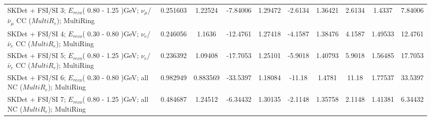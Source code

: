 \documentclass{standalone}
\begin{document}
\begin{tabular}{| l | S | S  S | S  S | S  S | S  S | }
SKDet + FSI/SI  3; $E_{reco}$( 0.80 - 1.25 )GeV; $\nu_{\mu}$/$\bar{\nu}_{\mu}$ CC ($MultiR_{e}$); MultiRing &        0.251603 &         1.22524 &        -7.84006 &         1.29472 &         -2.6134 &         1.36421 &          2.6134 &          1.4337 &         7.84006 \\ 
SKDet + FSI/SI  4; $E_{reco}$( 0.30 - 0.80 )GeV; $\nu_{e}$/$\bar{\nu}_{e}$ CC ($MultiR_{e}$); MultiRing &        0.246056 &          1.1636 &        -12.4761 &         1.27418 &         -4.1587 &         1.38476 &          4.1587 &         1.49533 &         12.4761 \\ 
SKDet + FSI/SI  5; $E_{reco}$( 0.80 - 1.25 )GeV; $\nu_{e}$/$\bar{\nu}_{e}$ CC ($MultiR_{e}$); MultiRing &        0.236392 &         1.09408 &        -17.7053 &         1.25101 &         -5.9018 &         1.40793 &          5.9018 &         1.56485 &         17.7053 \\ 
SKDet + FSI/SI  6; $E_{reco}$( 0.30 - 0.80 )GeV; all NC ($MultiR_{e}$); MultiRing &        0.982949 &        0.883569 &        -33.5397 &         1.18084 &          -11.18 &          1.4781 &           11.18 &         1.77537 &         33.5397 \\ 
SKDet + FSI/SI  7; $E_{reco}$( 0.80 - 1.25 )GeV; all NC ($MultiR_{e}$); MultiRing &        0.484687 &         1.24512 &        -6.34432 &         1.30135 &         -2.1148 &         1.35758 &          2.1148 &         1.41381 &         6.34432 \\ 
\bottomrule
\end{tabular}
\end{document}
